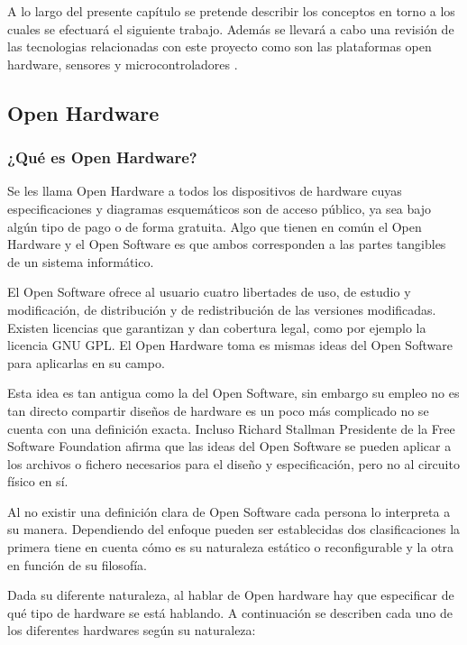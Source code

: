 
A lo largo del presente capítulo se pretende describir los conceptos en torno a los cuales se efectuará el siguiente trabajo. Además se llevará a cabo una revisión de las  tecnologias relacionadas con este proyecto como  son las  plataformas open hardware, sensores y microcontroladores .

\subsection{Open Hardware}
\subsubsection{¿Qué es Open Hardware?}
Se les llama Open Hardware a todos los dispositivos de hardware cuyas especificaciones y diagramas esquemáticos son de acceso público, ya sea bajo algún tipo de pago o de forma gratuita. Algo que tienen en común el Open Hardware y el Open Software es que ambos corresponden a las partes tangibles de un sistema informático.

El Open Software ofrece al usuario cuatro libertades de uso, de estudio  y modificación, de  distribución y de redistribución de las versiones modificadas. Existen licencias que  garantizan y dan cobertura legal,  como  por  ejemplo  la  licencia  GNU GPL. El Open Hardware toma es mismas ideas del Open Software para aplicarlas en su campo.\cite{Osh14}

Esta idea es tan antigua  como la  del Open Software, sin embargo  su  empleo no es tan directo compartir  diseños  de  hardware  es  un poco  más  complicado no se cuenta  con una definición exacta. Incluso Richard Stallman Presidente de la  Free Software Foundation afirma  que  las  ideas del Open Software  se  pueden  aplicar  a los archivos  o fichero necesarios  para el diseño y especificación, pero no  al circuito físico  en  sí.  

Al no existir una  definición clara de Open Software cada persona  lo  interpreta  a su manera. Dependiendo  del  enfoque  pueden  ser  establecidas dos clasificaciones  la primera  tiene en cuenta  cómo es  su naturaleza estático o  reconfigurable  y la  otra   en función  de  su filosofía.


Dada su diferente naturaleza, al hablar de Open hardware hay que especificar de qué tipo de hardware se está hablando. A continuación se describen cada uno de los diferentes hardwares según su naturaleza:

